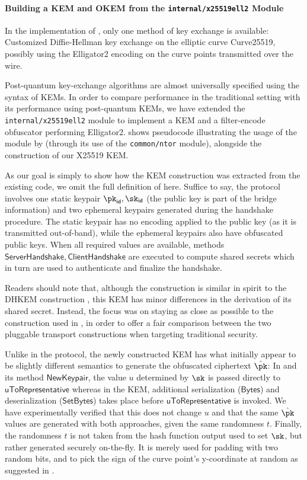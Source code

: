 \paragraph{Building a KEM and OKEM from the \texttt{internal/x25519ell2} Module}

In the implementation of \obfsfour{}, only one method of key exchange is available: Customized Diffie-Hellman key exchange on the elliptic curve Curve25519, possibly using the \textsf{Elligator2} encoding on the curve points transmitted over the wire.

Post-quantum key-exchange algorithms are almost universally specified using the syntax of KEMs. In order to compare \drivel{} performance in the traditional setting with its performance using post-quantum KEMs, we have extended the \texttt{internal/x25519ell2} module to implement a KEM and a filter-encode obfuscator performing \textsf{Elligator2}.  shows pseudocode illustrating the usage of the module by \obfsfour{} (through its use of the \texttt{common/ntor} module), alongside the construction of our X25519 KEM.

As our goal is simply to show how the KEM construction was extracted from the existing code, we omit the full definition of \obfsfour{} here. Suffice to say, the protocol involves one static keypair $\pk_\mathsf{id}, \sk_\mathsf{id}$ (the public key is part of the bridge information) and two ephemeral keypairs generated during the handshake procedure. The static keypair has no encoding applied to the public key (as it is transmitted out-of-band), while the ephemeral keypairs also have obfuscated public keys. When all required values are available, methods $\mathsf{ServerHandshake}, \mathsf{ClientHandshake}$ are executed to compute shared secrets which in turn are used to authenticate and finalize the handshake.

Readers should note that, although the construction is similar in spirit to the DHKEM construction \cite[Section~4.1]{rfc9180}, this KEM has minor differences in the derivation of its shared secret. Instead, the focus was on staying as close as possible to the construction used in \obfsfour{}, in order to offer a fair comparison between the two pluggable transport constructions when targeting traditional security.

Unlike in the \obfsfour{} protocol, the newly constructed KEM has what initially appear to be slightly different semantics to generate the obfuscated ciphertext $\hat \pk$:
In \obfsfour{} and its method $\mathsf{NewKeypair}$, the value $u$ determined by $\sk$ is passed directly to $\mathsf{uToRepresentative}$ whereas in the KEM, additional serialization ($\mathsf{Bytes}$) and deserialization ($\mathsf{SetBytes}$) takes place before $\mathsf{uToRepresentative}$ is invoked.
We have experimentally verified that this does not change $u$ and that the same $\hat \pk$ values are generated with both approaches, given the same randomness $t$.
Finally, the randomness $t$ is not taken from the hash function output used to set $\sk$, but rather generated securely on-the-fly. It is merely used for padding with two random bits, and to pick the sign of the curve point's y-coordinate at random as suggested in \cite{elligatorExplicitFormulas}.

